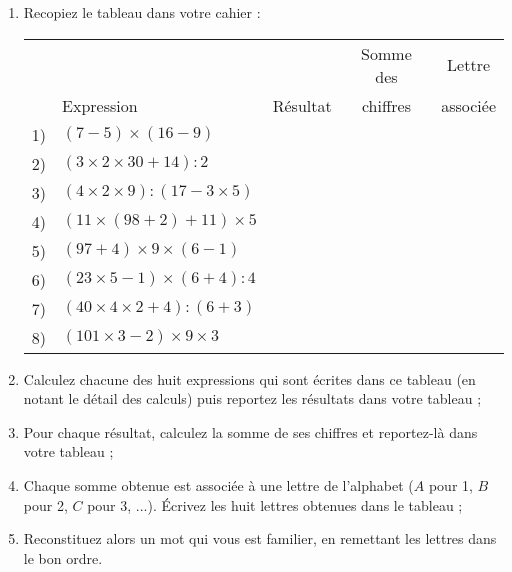 
\begin{TP}


\begin{enumerate}
 \item Recopiez le tableau dans votre cahier :
 
 \begin{center}
 \begin{tabularx}{\linewidth}{|c|X|c|c|c|}
  \hline
  \rowcolor{A3}  &  &  & Somme des & Lettre \\
  \rowcolor{A3} \multirow{-2}{*}{Calcul \no} & \multirow{-2}{*}{Expression} & \multirow{-2}{*}{Résultat} &  chiffres & associée \\\hline
  \rowcolor{F3} 1) & $(7 - 5) \times (16 - 9)$ & & & \\\hline
  \rowcolor{A2} 2) & $(3 \times 2 \times 30 + 14) : 2$ & & & \\\hline
  \rowcolor{F3} 3) & $(4 \times 2 \times 9) : (17 - 3 \times 5)$ &  & &\\\hline
  \rowcolor{A2} 4) & $(11 \times (98 + 2) + 11) \times 5$ & &  & \\\hline
  \rowcolor{F3} 5) & $(97 + 4) \times 9 \times (6 - 1)$ & & &  \\\hline
  \rowcolor{A2} 6) & $(23 \times 5 - 1) \times (6 + 4) : 4$ & &  & \\\hline
  \rowcolor{F3} 7) & $(40 \times 4 \times 2 + 4) : (6 + 3)$ & &  &\\\hline
  \rowcolor{A2} 8) & $(101 \times 3 - 2) \times 9 \times 3$ & &  &\\\hline
  \end{tabularx}
\end{center}

 \item Calculez chacune des huit expressions qui sont écrites dans ce tableau (en notant le détail des calculs) puis reportez les résultats dans votre tableau ;
 \item Pour chaque résultat, calculez la somme de ses chiffres et reportez-là dans votre tableau ;
 \item Chaque somme obtenue est associée à une lettre de l'alphabet ($A$ pour 1, $B$ pour 2, $C$ pour 3, ...). Écrivez les huit lettres obtenues dans le tableau ;
 \item Reconstituez alors un mot qui vous est familier, en remettant les lettres dans le bon ordre.
\end{enumerate}


\end{TP}
